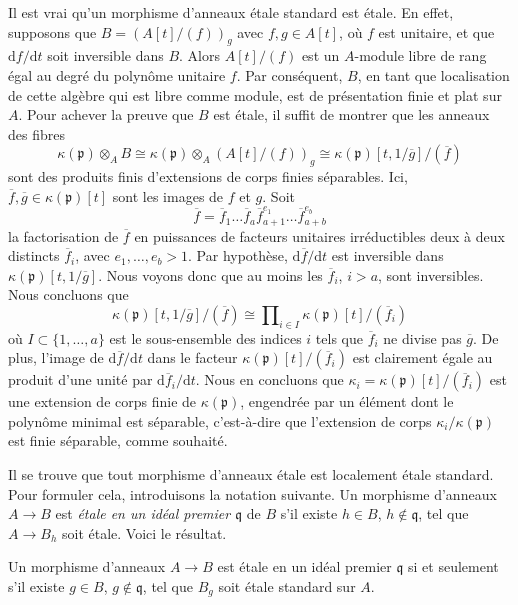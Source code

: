 \noindent
Il est vrai qu'un morphisme d'anneaux \'etale standard est \'etale. En effet, supposons
que $B = \left(A[t]/(f)\right)_g$ avec $f, g \in A[t]$, o\`u $f$ est unitaire,
et que $\text{d}f/\text{d}t$ soit inversible dans $B$. Alors $A[t]/(f)$ est un
$A$-module libre de rang \'egal au degr\'e du polyn\^ome unitaire $f$.
Par cons\'equent, $B$, en tant que localisation de cette alg\`ebre qui est libre comme module, est de pr\'esentation finie
et plat sur $A$. Pour achever la preuve que $B$ est \'etale, il suffit
de montrer que les anneaux des fibres
$$
\kappa(\mathfrak p) \otimes_A B
\cong
\kappa(\mathfrak p) \otimes_A (A[t]/(f))_g
\cong
\kappa(\mathfrak p)[t, 1/\overline{g}]/(\overline{f})
$$
sont des produits finis d'extensions de corps finies s\'eparables.
Ici, $\overline{f}, \overline{g} \in \kappa(\mathfrak p)[t]$ sont
les images de $f$ et $g$. Soit
$$
\overline{f} = \overline{f}_1 \ldots \overline{f}_a
\overline{f}_{a + 1}^{e_1} \ldots \overline{f}_{a + b}^{e_b}
$$
la factorisation de $\overline{f}$ en puissances de facteurs unitaires irr\'eductibles
deux \`a deux distincts $\overline{f}_i$, avec $e_1, \ldots, e_b > 1$.
Par hypoth\`ese, $\text{d}\overline{f}/\text{d}t$ est inversible dans
$\kappa(\mathfrak p)[t, 1/\overline{g}]$. Nous voyons donc que
au moins les $\overline{f}_i$, $i > a$, sont inversibles. Nous concluons
que
$$
\kappa(\mathfrak p)[t, 1/\overline{g}]/(\overline{f})
\cong
\prod\nolimits_{i \in I} \kappa(\mathfrak p)[t]/(\overline{f}_i)
$$
o\`u $I \subset \{1, \ldots, a\}$ est le sous-ensemble des indices $i$ tels que
$\overline{f}_i$ ne divise pas $\overline{g}$. De plus, l'image de
$\text{d}\overline{f}/\text{d}t$ dans le facteur
$\kappa(\mathfrak p)[t]/(\overline{f}_i)$ est clairement \'egale au produit d'une
unit\'e par $\text{d}\overline{f}_i/\text{d}t$. Nous en concluons que
$\kappa_i = \kappa(\mathfrak p)[t]/(\overline{f}_i)$ est une extension de corps
finie de $\kappa(\mathfrak p)$, engendr\'ee par un \'el\'ement dont le
polyn\^ome minimal est s\'eparable, c'est-\`a-dire que l'extension de corps
$\kappa_i/\kappa(\mathfrak p)$ est finie s\'eparable, comme souhait\'e.

\medskip\noindent
Il se trouve que tout morphisme d'anneaux \'etale est localement \'etale standard.
Pour formuler cela, introduisons la notation suivante.
Un morphisme d'anneaux $A \to B$ est {\it \'etale en un id\'eal premier $\mathfrak q$} de $B$ s'il
existe $h \in B$, $h \not \in \mathfrak q$, tel que $A \to B_h$ soit \'etale.
Voici le r\'esultat.

\begin{theorem}
\label{theorem-standard-etale}
Un morphisme d'anneaux $A \to B$ est \'etale en un id\'eal premier $\mathfrak q$ si et seulement s'il
existe $g \in B$, $g \not \in \mathfrak q$, tel que $B_g$ soit \'etale
standard sur $A$.
\end{theorem}

